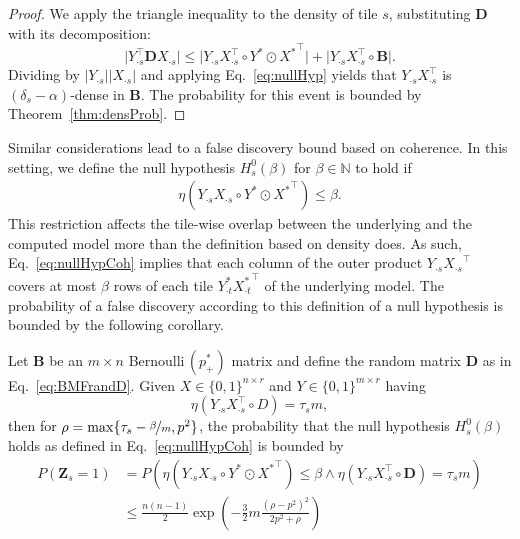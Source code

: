 \begin{proof}
We apply the triangle inequality to the density of tile $s$, substituting $\mathbf{D}$ with its decomposition:
\[\bigl\lvert Y_{\cdot s}^\top \mathbf{D}X_{\cdot s}\bigr\rvert \leq \bigl\lvert Y_{\cdot s}X_{\cdot s}^\top\circ Y^*\odot{X^*}^\top\bigr\rvert +\bigl\lvert Y_{\cdot s}X_{\cdot s}^\top \circ \mathbf{B}\bigr\rvert .\]
Dividing by $\lvert Y_{\cdot s}\rvert \lvert X_{\cdot s}\rvert $ and applying Eq.~\eqref{eq:nullHyp} yields that $Y_{\cdot s}X_{\cdot s}^\top$ is $(\delta_s-\alpha)$-dense in $\mathbf{B}$.
The probability for this event is bounded by Theorem~\ref{thm:densProb}.
\end{proof}
Similar considerations lead to a false discovery bound based on coherence. In this setting, we define the null hypothesis $H_s^0(\beta)$ for $\beta\in\mathbb{N}$ to hold if 
\begin{align}\label{eq:nullHypCoh}
 \eta\left(Y_{\cdot s}X_{\cdot s}\circ Y^*\odot{X^*}^\top\right)\leq \beta.
\end{align}
This restriction affects the tile-wise overlap between the underlying and the computed model more than the definition based on density does. As such, Eq.~\eqref{eq:nullHypCoh} implies that each column of the outer product $Y_{\cdot s}{X_{\cdot s}}^\top$ covers at most $\beta$ rows of each tile $Y^*_{\cdot t}{X^*_{\cdot t}}^\top$ of the underlying model. The probability of a false discovery according to this definition of a null hypothesis is bounded by the following corollary. 
\begin{corollary}\label{thm:cohZ}
Let $\mathbf{B}$ be an $m\times n$ Bernoulli$\,(p_+^*)$ matrix and define the random matrix $\mathbf{D}$ as in Eq.~\eqref{eq:BMFrandD}. Given $X\in\{0,1\}^{n\times r}$ and $Y\in\{0,1\}^{m\times r}$ having
\[\eta\left(Y_{\cdot s}X_{\cdot s}^\top \circ D\right)= \tau_s m,\] 
then for $\rho = \max\{\tau_s-\nicefrac{\beta}{m},p^2\}$, the probability that the null hypothesis $H_s^0(\beta)$ holds as defined in Eq.~\eqref{eq:nullHypCoh} is bounded by
\begin{align*}
P(\mathbf{Z}_s=1)&=P\left(\eta\left(Y_{\cdot s}X_{\cdot s}\circ Y^*\odot{X^*}^\top\right)\leq \beta \wedge \eta\left(Y_{\cdot s}X_{\cdot s}^\top \circ \mathbf{D}\right)= \tau_s m\right)\\
&\leq \frac{n(n-1)}{2}\exp\left(-\frac{3}{2}m\frac{\left(\rho-p^2\right)^2}{2p^2+\rho}\right)
\end{align*}
\end{corollary}
